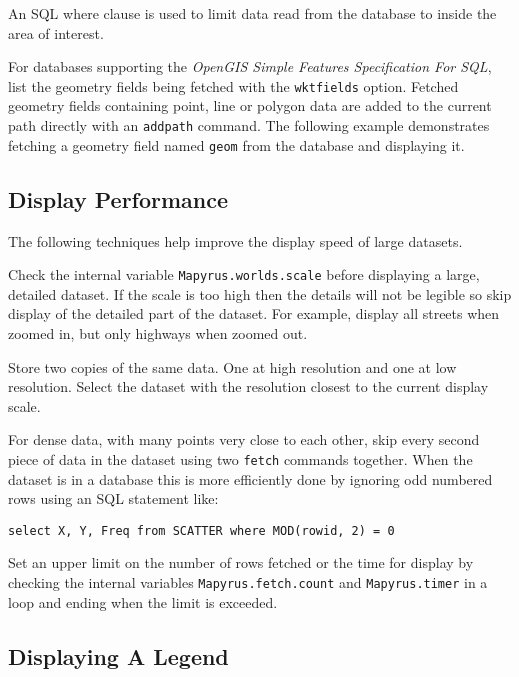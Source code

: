 An SQL where clause is used to limit data read from
the database to inside the area of interest.



For databases supporting the \textit{OpenGIS Simple Features Specification For
SQL}, list the geometry fields being fetched with the \texttt{wktfields}
option.  Fetched geometry fields containing point, line or polygon data are
added to the current path directly with an \texttt{addpath} command.  The
following example demonstrates fetching a geometry field named \texttt{geom}
from the database and displaying it.



\subsection{Display Performance}

The following techniques help improve the display speed of large datasets.

Check the internal variable \texttt{Mapyrus.worlds.scale} before displaying a
large, detailed dataset.  If the scale is too high then the details will not be
legible so skip display of the detailed part of the dataset.  For example,
display all streets when zoomed in, but only highways when zoomed out.

Store two copies of the same data.  One at high resolution and one at low
resolution.  Select the dataset with the resolution closest to the current
display scale.

For dense data, with many points very close to each other, skip every second
piece of data in the dataset using two \texttt{fetch} commands together.  When
the dataset is in a database this is more efficiently done by ignoring odd
numbered rows using an SQL statement like:

\begin{verbatim}
select X, Y, Freq from SCATTER where MOD(rowid, 2) = 0
\end{verbatim}

Set an upper limit on the number of rows fetched or the time for display by
checking the internal variables \texttt{Mapyrus.fetch.count} and
\texttt{Mapyrus.timer} in a loop and ending when the limit is exceeded.

\subsection{Displaying A Legend}

